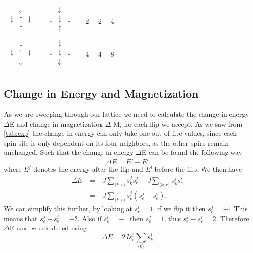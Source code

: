 \documentclass[%
reprint,
nofootinbib,
amsmath,amssymb,
aps,
]{revtex4-1}
\begin{document}
\begin{table}
\begin{tabular}{@{}|c|c|c|c|c|@{}}
$\begin{matrix}& \downarrow & \\ \downarrow & \uparrow & \downarrow \\ & \uparrow & \\ & & & \end{matrix}$   & $\begin{matrix}& \downarrow & \\ \downarrow & \downarrow & \downarrow \\ & \uparrow & \\ & & & \end{matrix}$ & 2& -2  & -4                 \\
$\begin{matrix}& \downarrow & \\ \downarrow & \uparrow & \downarrow \\ & \downarrow & \\ & & & \end{matrix}$ & $\begin{matrix}& \downarrow & \\ \downarrow & \downarrow & \downarrow \\ & \downarrow & \\ & & & \end{matrix}$ & 4 & -4 & -8                 \\ \hline
	\end{tabular}

\end{table}

\subsection{Change in Energy and Magnetization}%
As we are sweeping through our lattice we need to calculate the change in energy $\Delta$E and change in magnetization $\Delta$ M, for each flip we accept. As we saw from \autoref{tab:exp} the change in energy can only take one out of five values, since each spin site is only dependent on its four neighbors, as the other spins remain unchanged. Such that the change in energy $\Delta$E can be found the following way 
\begin{equation}
	\Delta E = E^j - E^i
\end{equation}
where $E^j$ denotes the energy after the flip and $E^i$ before the flip. We then have 
\begin{align}
	\Delta E &= -J\sum_{\langle k,e \rangle} s_k^js_e^j + J\sum_{\langle k,e \rangle} s_k^is_e^i\\
	&= -J\sum_{\langle k,e \rangle} s_k^j\left(s_e^j - s_e^i\right).
\end{align}
We can simplify this further, by looking at $s_e^i = 1$, if we flip it then $s_e^j = -1$ This means that $s_e^j-s_e^i = -2$. Also if $s_e^i = -1$ then $s_e^j = 1$, thus $s_e^j-s_e^i = 2$. Therefore $\Delta$E can be calculated using 
\begin{equation}
	\Delta E = 2Js_e^i\sum_{\langle k \rangle}s_k^i
\end{equation}
\end{document}
